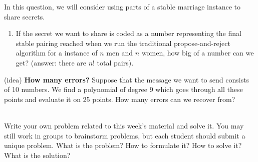 \documentclass[]{article}
\newif\ifsolutions
\renewcommand{\answer}[1]{{\color{mydarkblue}\textbf{}#1}}
\begin{document}
\begin{qunlist}
\qpart


\qpart




In this question, we will consider using parts of a stable marriage instance to share secrets. 

\begin{enumerate}
\qpart
\item  If the secret we want to share is coded as a number representing the final stable pairing reached when we run the traditional propose-and-reject algorithm for a instance of $n$ men and $n$ women, how big of a number can we get? (answer: there are $n!$ total pairs).

\end{enumerate}

\qpart
(idea) {\bf How many errors?}
Suppose that the message we want to send consists of 10 numbers. We find a polynomial of degree 9 which goes through all these points and evaluate it on 25 points. How many errors can we recover from?

\ifsolutions{ \answer 
{
For $ k $ erasure errors, we need to send $ k $ additional packets for a total of $ n+k $. Here, $ n=10 $ and $ n+k=25 $, so we can recover from 15 erasure errors.

For $ k $ general errors, we need $ 2k $ additional packets. We have 15 additional packets, so we may recover from $ \lfloor 15/2 \rfloor = 7 $ general errors.
}}\fi


 \\
Write your own problem related to this week's material and solve it. 
You may still work in groups to brainstorm problems, 
but each student should submit a unique problem.  
What is the problem? How to formulate it? 
How to solve it? What is the solution?
  
  
    
\end{qunlist}
\end{document}
